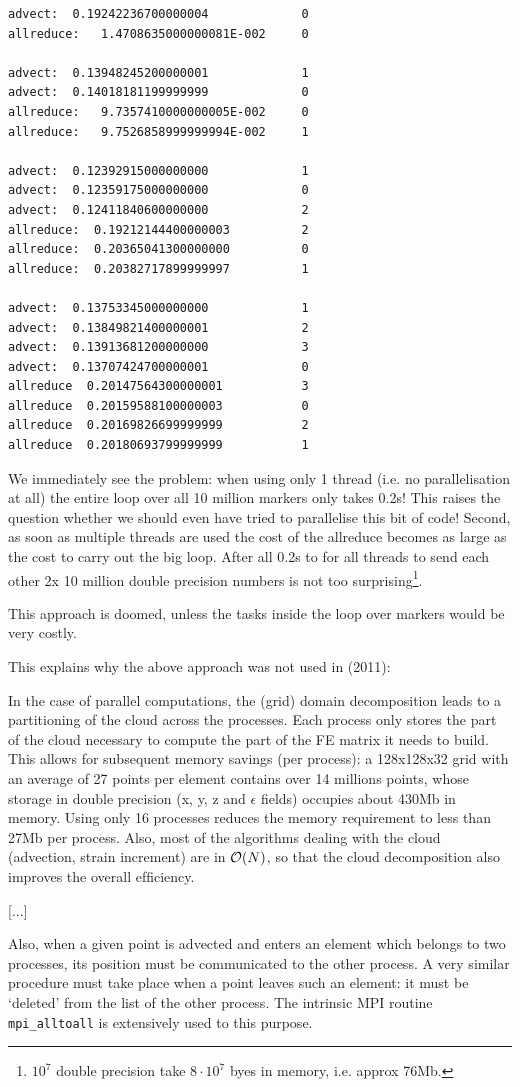 \begin{verbatim}
advect:  0.19242236700000004             0
allreduce:   1.4708635000000081E-002     0

advect:  0.13948245200000001             1
advect:  0.14018181199999999             0
allreduce:   9.7357410000000005E-002     0
allreduce:   9.7526858999999994E-002     1

advect:  0.12392915000000000             1
advect:  0.12359175000000000             0
advect:  0.12411840600000000             2
allreduce:  0.19212144400000003          2
allreduce:  0.20365041300000000          0
allreduce:  0.20382717899999997          1

advect:  0.13753345000000000             1
advect:  0.13849821400000001             2
advect:  0.13913681200000000             3
advect:  0.13707424700000001             0
allreduce  0.20147564300000001           3
allreduce  0.20159588100000003           0
allreduce  0.20169826699999999           2
allreduce  0.20180693799999999           1
\end{verbatim}

We immediately see the problem: when using only 1 thread (i.e. no parallelisation 
at all) the entire loop over all 10 million markers only takes 0.2s! 
This raises the question whether we should even have tried to parallelise this 
bit of code! 
Second, as soon as multiple threads are used the cost of the allreduce becomes 
as large as the cost to carry out the big loop. After all 0.2s to for all threads 
to send each other 2x 10 million double precision numbers is not too 
surprising\footnote{$10^7$ double precision take $8\cdot 10^7$ byes in memory, 
i.e. approx 76Mb.}.


This approach is doomed, unless the tasks inside the loop over markers would be 
very costly.

This explains why the above approach was not used in \textcite{thie11} (2011):
\begin{displayquote}
{\color{darkgray} 
In the case of parallel computations, the (grid) domain decomposition leads 
to a partitioning of
the cloud across the processes. Each process only stores the part of
the cloud necessary to compute the part of the FE matrix it needs
to build. This allows for subsequent memory savings (per process):
a 128x128x32 grid with an average of 27 points per element
contains over 14 millions points, whose storage in double precision
(x, y, z and $\epsilon$ fields) occupies about 430Mb in memory. Using only
16 processes reduces the memory requirement to less than 27Mb
per process. Also, most of the algorithms dealing with the cloud
(advection, strain increment) are in ${\cal O}(N)$, so that the cloud decomposition 
also improves the overall efﬁciency.

[...]

Also, when a given
point is advected and enters an element which belongs to two processes, 
its position must be communicated to the other process. A
very similar procedure must take place when a point leaves such
an element: it must be ‘deleted’ from the list of the other process.
The intrinsic MPI routine \verb|mpi_alltoall| is extensively used to this
purpose.
}
\end{displayquote}






